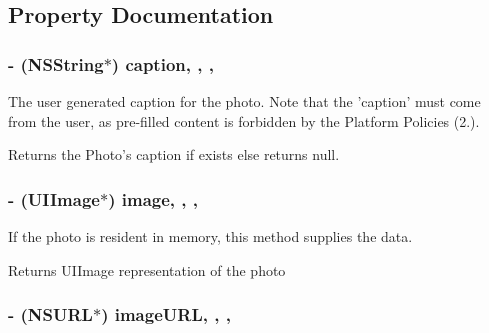 \subsection{Property Documentation}
\hypertarget{interface_f_b_s_d_k_share_photo_a378bd927653780e0ad52400dd095c333}{
\subsubsection[{caption}]{\setlength{\rightskip}{0pt plus 5cm}-\/ (N\-S\-String$\ast$) caption\hspace{0.3cm}{\ttfamily [read]}, {\ttfamily [write]}, {\ttfamily [nonatomic]}, {\ttfamily [copy]}}}\label{interface_f_b_s_d_k_share_photo_a378bd927653780e0ad52400dd095c333}
The user generated caption for the photo. Note that the 'caption' must come from the user, as pre-\/filled content is forbidden by the Platform Policies (2.). \begin{DoxyReturn}{Returns}
the Photo's caption if exists else returns null. 
\end{DoxyReturn}
\hypertarget{interface_f_b_s_d_k_share_photo_a93f461424066ad2f65b58902d95d5470}{
\subsubsection[{image}]{\setlength{\rightskip}{0pt plus 5cm}-\/ (U\-I\-Image$\ast$) image\hspace{0.3cm}{\ttfamily [read]}, {\ttfamily [write]}, {\ttfamily [nonatomic]}, {\ttfamily [strong]}}}\label{interface_f_b_s_d_k_share_photo_a93f461424066ad2f65b58902d95d5470}
If the photo is resident in memory, this method supplies the data. \begin{DoxyReturn}{Returns}
U\-I\-Image representation of the photo 
\end{DoxyReturn}
\hypertarget{interface_f_b_s_d_k_share_photo_a499fdf232b43b9222e9db5f320bda63d}{
\subsubsection[{image\-U\-R\-L}]{\setlength{\rightskip}{0pt plus 5cm}-\/ (N\-S\-U\-R\-L$\ast$) image\-U\-R\-L\hspace{0.3cm}{\ttfamily [read]}, {\ttfamily [write]}, {\ttfamily [nonatomic]}, {\ttfamily [copy]}}}\label{interface_f_b_s_d_k_share_photo_a499fdf232b43b9222e9db5f320bda63d}
